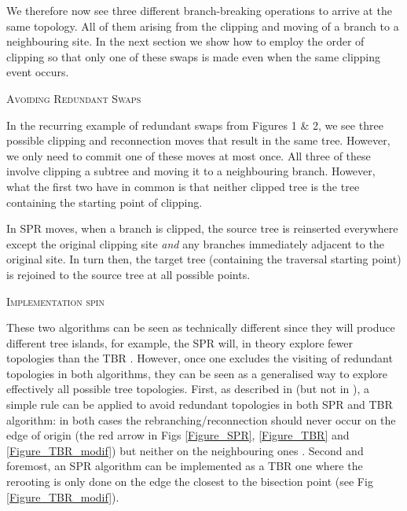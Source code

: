 \documentclass[12pt,letterpaper]{article}
\renewcommand{\section}[1]{%
\bigskip
\begin{center}
\begin{Large}
\normalfont\scshape #1
\medskip
\end{Large}
\end{center}}
\begin{document}
We therefore now see three different branch-breaking operations to arrive at the same topology. 
All of them arising from the clipping and moving of a branch to a neighbouring site.
In the next section we show how to employ the order of clipping so that only one of these swaps is made even when the same clipping event occurs.

\section{Avoiding Redundant Swaps}
In the recurring example of redundant swaps from Figures 1 & 2, we see three possible clipping and reconnection moves that result in the same tree.
However, we only need to commit one of these moves at most once.
All three of these involve clipping a subtree and moving it to a neighbouring branch. 
However, what the first two have in common is that neither clipped tree is the tree containing the starting point of clipping. %

In SPR moves, when a branch is clipped, the source tree is reinserted everywhere except the original clipping site \textit{and} any branches immediately adjacent to the original site. 
In turn then, the target tree (containing the traversal starting point) is rejoined to the source tree at all possible points. 


\section{Implementation spin}
These two algorithms can be seen as technically different since they will produce different tree islands, for example, the SPR will, in theory explore fewer topologies than the TBR \citep[see above and][]{morrison2007increasing,lakner2008efficiency}.
However, once one excludes the visiting of redundant topologies in both algorithms, they can be seen as a generalised way to explore effectively all possible tree topologies.
First, as described in \cite{allen2001subtree} (but not in \citealt{felsenstein2004inferring}), a simple rule can be applied to avoid redundant topologies in both SPR and TBR algorithm: in both cases the rebranching/reconnection should never occur on the edge of origin (the red arrow in Figs \ref{Figure_SPR}, \ref{Figure_TBR} and \ref{Figure_TBR_modif}) but neither on the neighbouring ones \citep{allen2001subtree}.
Second and foremost, an SPR algorithm can be implemented as a TBR one where the rerooting is only done on the edge the closest to the bisection point (see Fig \ref{Figure_TBR_modif}).
\end{document}
